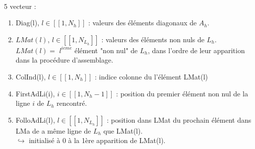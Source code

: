 \documentclass[12pt,a4paper]{article}
\begin{document}
	\begin{defi}$ $\\
		\begin{minipage}[t]{18cm}
			5 vecteur :
		\begin{enumerate}[label=$\star$]
			\item Diag(l), $l \in [\![1,N_h]\!]$ : valeurs des éléments diagonaux de $A_h$.
			
			\item  $LMat(l)$, $l \in [\![1, N_{L_h}]\!]$ : valeurs des éléments non nuls de $L_h$.\\
			$LMat(l) = $ $l^{ieme}$ élément "non nul" de $L_h$, dans l'ordre de leur apparition dans la procédure d'assemblage.
			
			\item ColInd(l), $l \in [\![1,N_h]\!]$ : indice colonne du l'élément LMat(l)
			
			\item  FirstAdLi(i), $i \in [\![1,N_h-1]\!]$ : position du premier élément non nul de la ligne $i$ de $L_h$ rencontré.
			
			\item  FolloAdLi(l), $l \in [\![1,N_{L_h}]\!]$ : position dans LMat du prochain élément dans LMa de a même ligne de $L_h$ que LMat(l).\\
			$\hookrightarrow$ initialisé à 0 à la 1ère apparition de LMat(l).
		\end{enumerate}
		\end{minipage}
	\end{defi}
	
\end{document}
